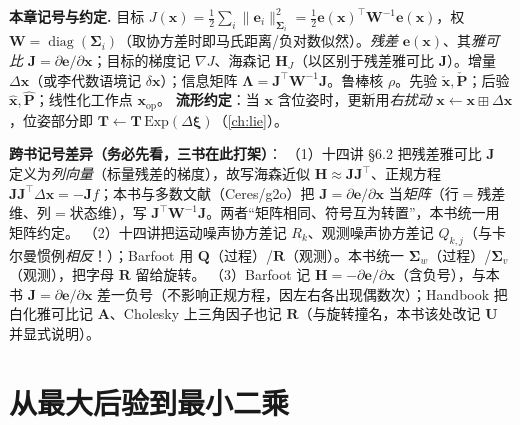 \begin{note}
\textbf{本章记号与约定.}\;
目标 $J(\mathbf{x})=\tfrac12\sum_i\|\mathbf{e}_i\|_{\boldsymbol{\Sigma}_i}^2=\tfrac12\mathbf{e}(\mathbf{x})^\top\mathbf{W}^{-1}\mathbf{e}(\mathbf{x})$，权 $\mathbf{W}=\operatorname{diag}(\boldsymbol{\Sigma}_i)$（取协方差时即马氏距离/负对数似然）。\emph{残差} $\mathbf{e}(\mathbf{x})$、其\emph{雅可比} $\mathbf{J}=\partial\mathbf{e}/\partial\mathbf{x}$；目标的梯度记 $\nabla J$、海森记 $\mathbf{H}_J$（以区别于残差雅可比 $\mathbf{J}$）。增量 $\Delta\mathbf{x}$（或李代数语境记 $\delta\mathbf{x}$）；信息矩阵 $\boldsymbol{\Lambda}=\mathbf{J}^\top\mathbf{W}^{-1}\mathbf{J}$。鲁棒核 $\rho$。先验 $\check{\mathbf{x}},\check{\mathbf{P}}$；后验 $\hat{\mathbf{x}},\hat{\mathbf{P}}$；线性化工作点 $\mathbf{x}_{\mathrm{op}}$。
\textbf{流形约定}：当 $\mathbf{x}$ 含位姿时，更新用\emph{右扰动} $\mathbf{x}\leftarrow\mathbf{x}\boxplus\Delta\mathbf{x}$，位姿部分即 $\mathbf{T}\leftarrow\mathbf{T}\,\mathrm{Exp}(\Delta\boldsymbol{\xi})$（\cref{ch:lie}）。

\textbf{跨书记号差异（务必先看，三书在此打架）}：
（1）十四讲\cite{gaoxiang2019slam14} §6.2 把残差雅可比 $\mathbf{J}$ 定义为\emph{列向量}（标量残差的梯度），故写海森近似 $\mathbf{H}\approx\mathbf{J}\mathbf{J}^\top$、正规方程 $\mathbf{J}\mathbf{J}^\top\Delta\mathbf{x}=-\mathbf{J}f$；本书与多数文献（Ceres/g2o）把 $\mathbf{J}=\partial\mathbf{e}/\partial\mathbf{x}$ 当\emph{矩阵}（行$=$残差维、列$=$状态维），写 $\mathbf{J}^\top\mathbf{W}^{-1}\mathbf{J}$。两者“矩阵相同、符号互为转置”，本书统一用矩阵约定。
（2）十四讲把运动噪声协方差记 $R_k$、观测噪声协方差记 $Q_{k,j}$（与卡尔曼惯例\emph{相反}！）；Barfoot\cite{barfoot2024state} 用 $\mathbf{Q}$（过程）/$\mathbf{R}$（观测）。本书统一 $\boldsymbol{\Sigma}_w$（过程）/$\boldsymbol{\Sigma}_v$（观测），把字母 $\mathbf{R}$ 留给旋转。
（3）Barfoot 记 $\mathbf{H}=-\partial\mathbf{e}/\partial\mathbf{x}$（含负号），与本书 $\mathbf{J}=\partial\mathbf{e}/\partial\mathbf{x}$ 差一负号（不影响正规方程，因左右各出现偶数次）；Handbook\cite{carlone2026handbook} 把白化雅可比记 $\mathbf{A}$、Cholesky 上三角因子也记 $\mathbf{R}$（与旋转撞名，本书该处改记 $\mathbf{U}$ 并显式说明）。
\end{note}

\section{从最大后验到最小二乘}
\label{sec:nlopt-map}


